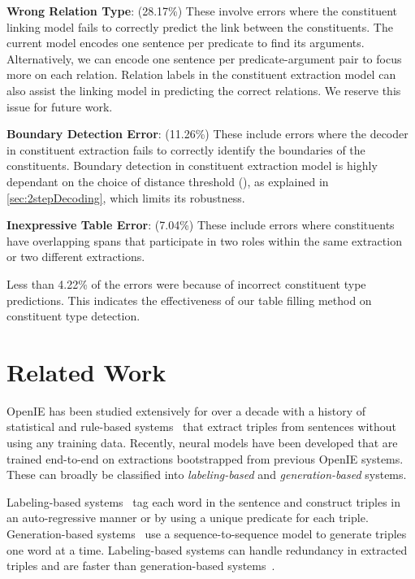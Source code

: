 \documentclass[11pt,a4paper]{article}
\begin{document}
\noindent
\textbf{Wrong Relation Type}: (28.17\%) These involve errors where the constituent linking model fails to correctly predict the link between the constituents. The current model encodes one sentence per predicate to find its arguments. Alternatively, we can encode one sentence per predicate-argument pair to focus more on each relation. Relation labels in the constituent extraction model can also assist the linking model in predicting the correct relations. We reserve this issue for future work.

\noindent
\textbf{Boundary Detection Error}: (11.26\%) These include errors where the decoder in constituent extraction fails to correctly identify the boundaries of the constituents. Boundary detection in constituent extraction model is highly dependant on the choice of distance threshold (), as explained in \ref{sec:2stepDecoding}, which limits its robustness. 

\noindent
\textbf{Inexpressive Table Error}: (7.04\%) These include errors where constituents have overlapping spans that participate in two roles within the same extraction or two different extractions.

Less than 4.22\% of the errors were because of incorrect constituent type predictions. This indicates the effectiveness of our table filling method on constituent type detection.

\section{Related Work}

OpenIE has been studied extensively for over a decade with a history of statistical and rule-based systems~\cite{textRunner,fader2011identifying,clausie,schmitz2012open,angeli2015leveraging} that extract triples from sentences without using any training data. Recently, neural models have been developed that are trained end-to-end on extractions bootstrapped from previous OpenIE systems. These can broadly be classified into {\it labeling-based} and {\it generation-based} systems. 

Labeling-based systems~\cite{stanovsky2018supervised,openie6,multi2OIE} tag each word in the sentence and construct triples in an auto-regressive manner or by using a unique predicate for each triple. Generation-based  systems~\cite{imojie,bhutani2019open} use a sequence-to-sequence model to generate triples one word at a time. Labeling-based systems can handle redundancy in extracted triples and are faster than generation-based systems~\cite{openie6}.
\end{document}
